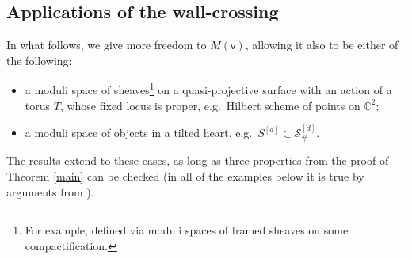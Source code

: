 \documentclass[11pt, reqno]{amsart}
\theoremstyle{plain}
\theoremstyle{definition}
\theoremstyle{remark}
\newcommand{\BC}{{\mathbb{C}}}
\newcommand{\CS}{{\mathcal S}}
\newcommand{\vsf}{{\mathsf{v}}}
\begin{document}

\subsection{Applications of the wall-crossing} \label{applications1}
In what follows, we give more freedom to $M(\vsf)$,  allowing it also to be either of the following:
\begin{itemize}
	\item a  moduli space of sheaves\footnote{For example, defined via moduli spaces of framed sheaves on some compactification.} on a quasi-projective surface with an action of a torus $T$, whose fixed locus is proper, e.g.\ Hilbert scheme of points on $\BC^2$; 
	\item a moduli space of objects in a tilted heart, e.g.\ $S^{[d]} \subset \CS_\#^{[d]}$. 
	\end{itemize}
The results extend to these cases, as long as three properties from the proof of Theorem \ref{main} can be checked (in all of the examples below it is true by arguments from \cite{N}).  
\end{document}
